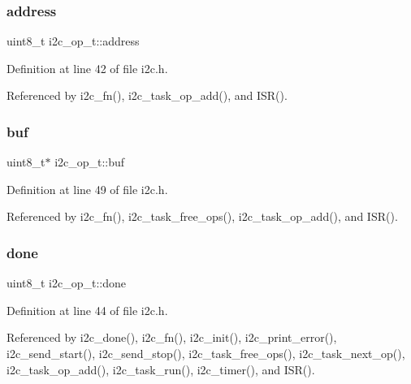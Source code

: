 \subsubsection{\texorpdfstring{address}{address}}
{\footnotesize\ttfamily uint8\+\_\+t i2c\+\_\+op\+\_\+t\+::address}



Definition at line 42 of file i2c.\+h.



Referenced by i2c\+\_\+fn(), i2c\+\_\+task\+\_\+op\+\_\+add(), and I\+S\+R().

\mbox{\label{structi2c__op__t_a1b38c7b78966e4464cfb858f223bf89a}} 
\subsubsection{\texorpdfstring{buf}{buf}}
{\footnotesize\ttfamily uint8\+\_\+t$\ast$ i2c\+\_\+op\+\_\+t\+::buf}



Definition at line 49 of file i2c.\+h.



Referenced by i2c\+\_\+fn(), i2c\+\_\+task\+\_\+free\+\_\+ops(), i2c\+\_\+task\+\_\+op\+\_\+add(), and I\+S\+R().

\mbox{\label{structi2c__op__t_a281b1e75543e100e4bac1f48d35ecd91}} 
\subsubsection{\texorpdfstring{done}{done}}
{\footnotesize\ttfamily uint8\+\_\+t i2c\+\_\+op\+\_\+t\+::done}



Definition at line 44 of file i2c.\+h.



Referenced by i2c\+\_\+done(), i2c\+\_\+fn(), i2c\+\_\+init(), i2c\+\_\+print\+\_\+error(), i2c\+\_\+send\+\_\+start(), i2c\+\_\+send\+\_\+stop(), i2c\+\_\+task\+\_\+free\+\_\+ops(), i2c\+\_\+task\+\_\+next\+\_\+op(), i2c\+\_\+task\+\_\+op\+\_\+add(), i2c\+\_\+task\+\_\+run(), i2c\+\_\+timer(), and I\+S\+R().

\mbox{\label{structi2c__op__t_a482a75434d75a91f2c3b4c8f37dbe201}} 

